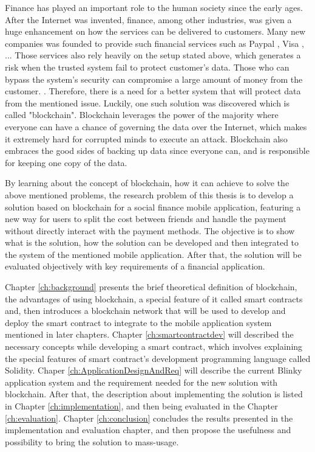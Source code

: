 \documentclass[twoside,numperchapter]{tutthesis} %
\begin{document}
Finance has played an important role to the human society since the early ages. After the Internet was invented, finance, among other industries, was given a huge enhancement on how the services can be delivered to customers. Many new companies was founded to provide such financial services such as Paypal \citep{Paypal}, Visa \citep{Visa}, ... Those services also rely heavily on the setup stated above, which generates a risk when the trusted system fail to protect customer's data. Those who can bypass the system's security can compromise a large amount of money from the customer. \citep{IndianBankHack}. Therefore, there is a need for a better system that will protect data from the mentioned issue. Luckily, one such solution was discovered which is called "blockchain". Blockchain leverages the power of the majority where everyone can have a chance of governing the data over the Internet, which makes it extremely hard for corrupted minds to execute an attack. Blockchain also embraces the good sides of backing up data since everyone can, and is responsible for keeping one copy of the data.

By learning about the concept of blockchain, how it can achieve to solve the above mentioned problems, the research problem of this thesis is to develop a solution based on blockchain for a social finance mobile application, featuring a new way for users to split the cost between friends and handle the payment without directly interact with the payment methods. The objective is to show what is the solution, how the solution can be developed and then integrated to the system of the mentioned mobile application. After that, the solution will be evaluated objectively with key requirements of a financial application.

Chapter \ref{ch:background} presents the brief theoretical definition of blockchain, the advantages of using blockchain, a special feature of it called smart contracts and, then introduces a blockchain network that will be used to develop and deploy the smart contract to integrate to the mobile application system mentioned in later chapters. Chapter \ref{ch:smartcontractdev} will described the necessary concepts while developing a smart contract, which involves explaining the special features of smart contract's development programming language called Solidity. Chaper \ref{ch:ApplicationDesignAndReq} will describe the current Blinky application system and the requirement needed for the new solution with blockchain. After that, the description about implementing the solution is listed in Chapter \ref{ch:implementation}, and then being evaluated in the Chapter \ref{ch:evaluation}. Chapter \ref{ch:conclusion} concludes the results presented in the implementation and evaluation chapter, and then propose the usefulness and possibility to bring the solution to mass-usage.
\end{document}
